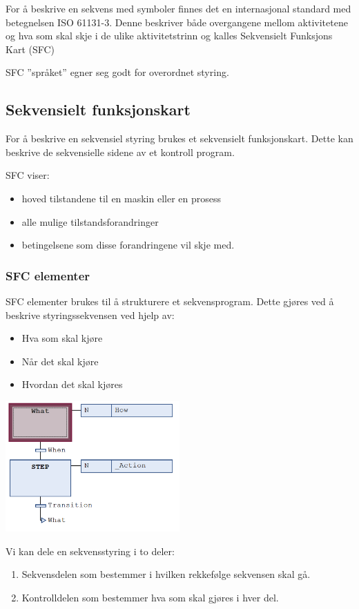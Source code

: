 For å beskrive en sekvens med symboler finnes det en internasjonal
standard med betegnelsen ISO 61131-3. Denne beskriver både overgangene
mellom aktivitetene og hva som skal skje i de ulike aktivitetstrinn
og kalles Sekvensielt Funksjons Kart (SFC)

SFC ''språket'' egner seg godt for overordnet styring.
\vskip 10pt


\subsection{Sekvensielt funksjonskart}

For å beskrive en sekvensiel styring brukes et sekvensielt funksjonskart.
Dette kan beskrive de sekvensielle sidene av et kontroll program. 

SFC viser:
\begin{itemize}
\item hoved tilstandene til en maskin eller en prosess
\item alle mulige tilstandsforandringer
\item betingelsene som disse forandringene vil skje med.
\end{itemize}

\subsubsection{SFC elementer}

SFC elementer brukes til å strukturere et sekvensprogram. Dette gjøres
ved å beskrive styringssekvensen ved hjelp av:
\begin{itemize}
	\item Hva som skal kjøre
	\item Når det skal kjøre
	\item Hvordan det skal kjøres
\end{itemize}
\includegraphics[width=0.5\textwidth]{SFC13.png}

Vi kan dele en sekvensstyring i to deler:
\begin{enumerate}
\item Sekvensdelen som bestemmer i hvilken rekkefølge sekvensen skal gå.
\item Kontrolldelen som bestemmer hva som skal gjøres i hver del.
\end{enumerate}

